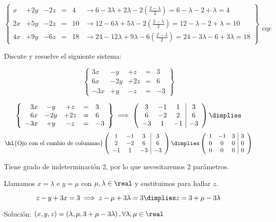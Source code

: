 \begin{problem}
\[
\left\{\begin{array}{lcccll}
x&+2y&-2z&=&4 &\to 6-3λ + 2λ - 2\displaystyle\left(\frac{2-λ}{2}\right) = 6-λ-2+λ = 4\\
2x&+5y&-2z&=&10 &\to 12-6λ +5λ - 2\displaystyle\left(\frac{2-λ}{2}\right) = 12-λ-2+λ = 10\\
4x&+9y&-6z&=&18 &\to 24-12λ + 9λ - 6\displaystyle\left(\frac{2-λ}{2}\right) = 24-3λ-6+3λ = 18
\end{array}\right\}\begin{array}{c}\\\\\\\\\text{cqc}\end{array}
\]

\end{problem}

\begin{problem}

Discute y resuelve el siguiente sistema:

\[
\left\{\begin{array}{rcccl}
3x&-y&+z&=&3\\
6x&-2y&+2z&=&6\\
-3x&+y&-z&=&-3
\end{array}\right\}
\]

\solution


\[
\left\{\begin{array}{rcccl}
3x&-y&+z&=&3\\
6x&-2y&+2z&=&6\\
-3x&+y&-z&=&-3
\end{array}\right\} \implies
\left(\begin{array}{ccc|c}
3&-1&1&3\\
6&-2&2&6\\
-3&1&-1&-3
\end{array}\right)
\dimplies\]
\[
\text{\hl{Ojo con el cambio de columnas}}
\left(\begin{array}{ccc|c}
1&-1&3&3\\
2&-2&6&6\\
-1&1&-3&-3
\end{array}\right)
\dimplies
\left(\begin{array}{ccc|c}
1&-1&3&3\\
0&0&0&0\\
0&0&0&0
\end{array}\right)
\]

Tiene grado de indeterminación 2, por lo que necesitaremos 2 parámetros.

Llamamos $x=\lambda$ e $y = \mu$ con $\mu,\lambda\in\real$ y sustituimos para hallar $z$.

$$z-y+3x=3 \implies z - \mu + 3\lambda = 3 \dimplies z = 3+\mu-3\lambda$$

Solución: $(x,y,z) = \left(\lambda, \mu, 3+\mu - 3\lambda\right), \forall\lambda,\mu\in\real$

\end{problem}

